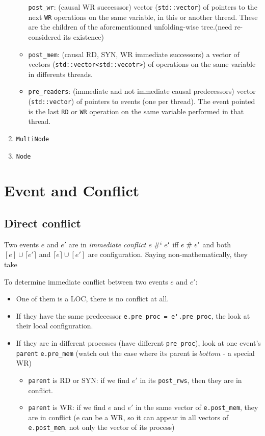 \documentclass{llncs}
\begin{document}
\begin{enumerate}
\begin{itemize}
  \verb!post_wr!: (causal WR successsor) vector (\verb!std::vector!) of
  pointers to the next \verb!WR! operations on the same variable, in this
  or another thread. These are the children of the aforementionned
  unfolding-wise tree.(need re-considered its existence)
\item
  \verb!post_mem!: (causal RD, SYN, WR immediate successors) a vector of vectors (\verb!std::vector<std::vecotr>!) of operations on the same variable in differents threads. 
	
\item
  \verb!pre_readers!: (immediate and not immediate causal predecessors)
  vector (\verb!std::vector!) of pointers to events (one per thread).
  The event pointed is the last \verb!RD! or \verb!WR! operation on the
  same variable performed in that thread.
\end{itemize}

\item
	\verb!MultiNode!
\item
	\verb!Node!

\end{enumerate}

\section{Event and Conflict}
\subsection{Direct conflict}
Two events $e$ and $e'$ are in \textit{immediate conflict} $e \mathrel{\#^i_{}} e' $ iff $e \mathrel{\#} e'$ and both $[e] \cup \lceil e' \rceil$ and $ \lceil e \rceil \cup [e']$ are configuration. Saying non-mathematically, they take 

To determine immediate conflict between two events $e$ and $e'$: 
\begin{itemize}
	\item
	One of them is a LOC, there is no conflict at all.
	\item
	If they have the same predecessor \verb!e.pre_proc = e'.pre_proc!, the look at their local configuration.
	\item
	If they are in different processes (have different \verb!pre_proc!), look at one event's \verb!parent! \verb!e.pre_mem! (watch out the case where its parent is $bottom$ - a special WR)
	\begin{itemize}
		\item
		\verb!parent! is RD or SYN: if we find $e'$ in its \verb!post_rws!, then they are in
		conflict.
		\item
		\verb!parent! is WR: if we find $e$ and $e'$ in the same vector of \verb!e.post_mem!,
		they are in conflict (e can be a WR, so it can appear in all vectors of 
		\verb!e.post_mem!, not only the vector of its process)
	\end{itemize}
	
\end{itemize}
\end{document}
